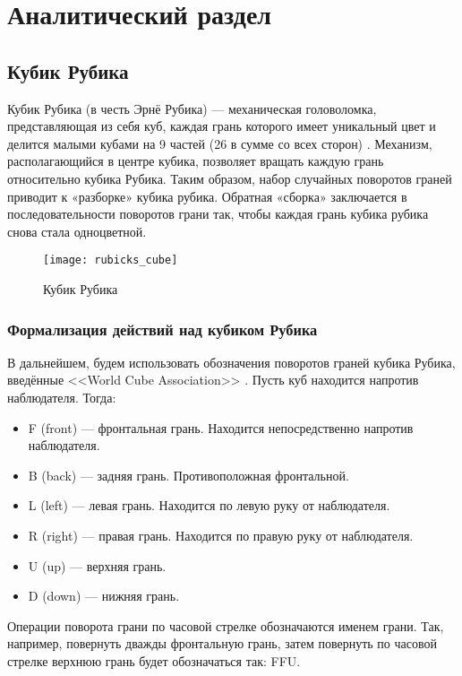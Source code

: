 \section{Аналитический раздел}
\subsection{Кубик Рубика}
Кубик Рубика (в честь Эрнё Рубика) --- механическая головоломка, представляющая из себя куб,
каждая грань которого имеет уникальный цвет и делится малыми кубами на 9 частей (26 в сумме со всех сторон) \cite{bib:how_to_assemble}.
Механизм, располагающийся в центре кубика, позволяет вращать каждую грань относительно кубика Рубика.
Таким образом, набор случайных поворотов граней приводит к «разборке» кубика рубика.
Обратная «сборка» заключается в последовательности поворотов грани так,
чтобы каждая грань кубика рубика снова стала одноцветной.

\begin{figure}[ht]
	\centering
	\texttt{[image: rubicks\_cube]}
	\caption{Кубик Рубика}
	\label{fig:rubicks_cube}
\end{figure}

\subsubsection{Формализация действий над кубиком Рубика}
В дальнейшем, будем использовать обозначения поворотов граней кубика Рубика, введённые <<World Cube Association>> \cite{bib:cube_notation}. Пусть куб находится напротив наблюдателя. Тогда:

\begin{itemize}
	\item F (front) --- фронтальная грань. Находится непосредственно напротив наблюдателя.
	\item B (back) --- задняя грань. Противоположная фронтальной.
	\item L (left) --- левая грань. Находится по левую руку от наблюдателя.
	\item R (right) --- правая грань. Находится по правую руку от наблюдателя.
	\item U (up) --- верхняя грань.
	\item D (down) --- нижняя грань.
\end{itemize}

Операции поворота грани по часовой стрелке обозначаются именем грани. Так, например, повернуть дважды фронтальную грань, затем повернуть по часовой стрелке верхнюю грань будет обозначаться так: FFU.

